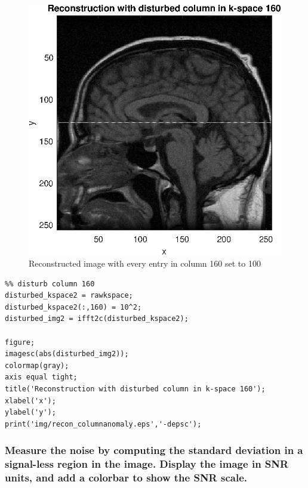 \begin{figure}[h!]
    \centering
    \includegraphics[width=.8\linewidth]{./homework4/img/recon_columnanomaly.eps}
    \caption{Reconstructed image with every entry in column 160 set to 100}
    \label{fig:recon_phase}
\end{figure}



\begin{lstlisting}
%% disturb column 160
disturbed_kspace2 = rawkspace;
disturbed_kspace2(:,160) = 10^2;
disturbed_img2 = ifft2c(disturbed_kspace2);

figure;
imagesc(abs(disturbed_img2));
colormap(gray);
axis equal tight;
title('Reconstruction with disturbed column in k-space 160');
xlabel('x');
ylabel('y');
print('img/recon_columnanomaly.eps','-depsc');
\end{lstlisting}




\subsubsection{Measure the noise by computing the standard deviation in a signal-less region in the
image. Display the image in SNR units, and add a colorbar to show the SNR scale.}

